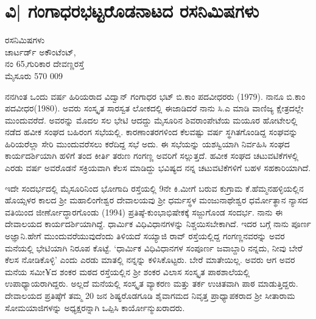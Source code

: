 \chapter{ವಿ| ಗಂಗಾಧರಭಟ್ಟರೊಡನಾಟದ ರಸನಿಮಿಷಗಳು} 

\begin{center}
\smallskip

ರಸನಿಮಿಷಗಳು\\
ಚಾರ್ಟರ್ಡ್ ಅಕೌಂಟೆಂಟ್,\\ 
ನಂ 65,ಗುರಿಕಾರ ದೇವಣ್ಣರಸ್ತೆ\\
ಮೈಸೂರು 570 009 
\end{center}

ನನಗಿಂತ ಒಂದು ವರ್ಷ ಹಿರಿಯರಾದ ವಿದ್ವಾನ್ ಗಂಗಾಧರ ಭಟ್ ಬಿ.ಕಾಂ ಪದವೀಧರರು (1979). ನಾನೂ ಬಿ.ಕಾಂ ಪದವೀಧರ(1980). ಅವರು ಸಂಸ್ಕೃತ ಸಾರಸ್ವತ ಲೋಕದಲ್ಲಿ ಈಜಾಡಿದರೆ ನಾನು ಸಿ.ಎ ಮಾಡಿ ವಾಣಿಜ್ಯ ಕ್ಷೇತ್ರದಲ್ಲೇ ಮುಂದುವರೆದೆ. ಅವರನ್ನು ಮೊದಲ ಸಲ ಭೇಟಿ ಆದದ್ದು ಮೈಸೂರಿನ ಶಿವರಾಂಪೇಟೆಯ ಮಯೂರ ಹೋಟೇಲಲ್ಲಿ ನಡೆದ ಹವೀಕ ಸಂಘದ ಬಹಿರಂಗ ಸಭೆಯಲ್ಲಿ. ಕಾರಣಾಂತರಗಳಿಂದ ಕೆಲವಷ್ಟು ವರ್ಷ ಸ್ಥಗಿತಗೊಂಡಿದ್ದ ಸಂಘವನ್ನು ಹಿರಿಯರೆಲ್ಲಾ ಸೇರಿ ಮುಂದುವರೆಸಲು ಕರೆದಿದ್ದ ಸಭೆ ಅದು. ಈ ಸಭೆಯನ್ನು ಯಶಸ್ವಿಯಾಗಿ ನಿರ್ವಹಿಸಿ ಸಂಘದ ಕಾರ್ಯದರ್ಶಿಯಾಗಿ ಹಳಿಗೆ ತಂದ ಕೀರ್ತಿ ತರುಣ ಗಂಗಣ್ಣ ಅವರಿಗೆ ಸಲ್ಲುತ್ತದೆ. ಹವೀಕ ಸಂಘದ ಚಟುವಟಿಕೆಗಳಲ್ಲಿ ಎರಡು ವರ್ಷ ಅವರೊಡನೆ ಸಕ್ರಿಯವಾಗಿ ಕೆಲಸ ಮಾಡಿದ್ದು ಭವಿಷ್ಯದ ನನ್ನ ಚಟುವಟಿಕೆಗಳಿಗೆ ಬಹಳ ಸಹಕಾರಿಯಾಗಿದೆ.

ಇದೇ ಸಂದರ್ಭದಲ್ಲಿ ಮೈಸೂರಿನಿಂದ ಭೋಗಾದಿ ರಸ್ತೆಯಲ್ಲಿ 9ನೇ ಕಿ.ಮೀಗೆ ಬರುವ ಕುಗ್ರಾಮ ಕೆ.ಹೆಮ್ಮನಹಳ್ಳಿಯಲ್ಲಿನ ಹೊಯ್ಸಳರ ಕಾಲದ ಶ್ರೀ ಮಹಾಲಿಂಗೇಶ್ವರ ದೇವಾಲಯವು ಶ್ರೀ ಧರ್ಮಸ್ಥಳ ಮಂಜುನಾಥೇಶ್ವರ ಧರ್ಮೋತ್ಥಾನ ನ್ಯಾಸದ ವತಿಯಿಂದ ಜೀರ್ಣೋದ್ಧಾರಗೊಂಡು (1994)    ಪ್ರತಿಷ್ಠೆ-ಕುಂಭಾಭಿಷೇಕಕ್ಕೆ ಸಜ್ಜುಗೊಂಡ ಸಂದರ್ಭ. ನಾನು ಈ ದೇವಾಲಯದ ಕಾರ್ಯದರ್ಶಿಯಾಗಿದ್ದೆ. ಧಾರ್ಮಿಕ ವಿಧಿವಿಧಾನಗಳನ್ನು  ನಿಶ್ಚಯಿಸಬೇಕಾಗಿದೆ. ಇದರ ಬಗ್ಗೆ ನಾನು ಪೂರ್ಣ ಅಜ್ಞಾನಿ.ಹೇಗೆ ಮುಂದುವರೆಯುವುದೆಂದು ತಿಳಿಯದೆ ಸಯ್ಯಾಜಿ ರಾವ್ ರಸ್ತೆಯಲ್ಲಿದ್ದ ಗಂಗಣ್ಣನವರನ್ನು ಅವರ ಮನೆಯಲ್ಲಿ ಭೇಟಿಯಾಗಿ ನಿರೂಪ ಕೊಟ್ಟೆ.  ‘ಧಾರ್ಮಿಕ ವಿಧಿವಿಧಾನಗಳ ಸಂಪೂರ್ಣ  ಜವಾಬ್ದಾರಿ ನನ್ನದು, ನೀವು ಬೇರೆ ಕೆಲಸ ನೋಡಿಕೊಳ್ಳಿ’  ಎಂದು ಎರಡು ಮಾತಲ್ಲಿ ನನ್ನನ್ನು ಕಳಿಸಿಕೊಟ್ಟರು. ಬೇರೆ ಮಾತೇಯಿಲ್ಲ. ಅವರು ಆಗ ಅವರ ಮನೆಯ ಸಮೀ¥ದ ಶಂಕರ ಮಠದ ರಸ್ತೆಯಲ್ಲಿನ ಶ್ರೀ ಶಂಕರ ವಿಲಾಸ ಸಂಸ್ಕೃತ ಪಾಠಶಾಲೆಯಲ್ಲಿ ಉಪಾಧ್ಯಾಯರಾಗಿದ್ದರು. ಅಲ್ಲದೆ ಮನೆಯಲ್ಲಿ ಸಂಸ್ಕೃತ ವ್ಯಾಕರಣ ಮತ್ತು ತರ್ಕ ಉಚಿತವಾಗಿ ಪಾಠ ಮಾಡುತ್ತಿದ್ದರು. ದೇವಾಲಯದ ಪ್ರತಿಷ್ಠೆಗೆ ತಮ್ಮ 20 ಜನ ಶಿಷ್ಯರೊಡಗೂಡಿ ಶೈವಾಗಮದ  ನಿವೃತ್ತ ಪ್ರಾಧ್ಯಾಪಕರಾದ ಶ್ರೀ ಸೀತಾರಾಮ ಸೋಮಯಾಜಿಗಳನ್ನು ಅಧ್ಯಕ್ಷರನ್ನಾಗಿ ಒಪ್ಪಿಸಿ ಕಾರ್ಯೋನ್ಮುಖರಾದರು. 

